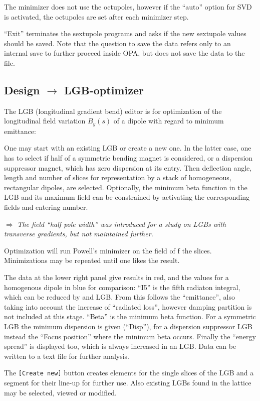 \documentclass[12pt]{article}
\newcommand\todo[1]{$\Longrightarrow$ {\em #1} }
\begin{document}
The minimizer does not use the octupoles, however if the ``auto'' option
for SVD is activated, the octupoles are set after each minimizer step.

``Exit'' terminates the sextupole programs and asks if the new sextupole values
should be saved. Note that the question to save the
data refers only to an internal save to further proceed inside OPA, but does
not save the data to the file.

\subsection{Design $\longrightarrow$ LGB-optimizer}
The LGB (longitudinal gradient bend) editor is for optimization of the longitudinal field variation $B_y(s)$ of a dipole with regard to minimum emittance:

One may start with an existing LGB or create a new one. 
In the latter case, one has to select if half of a symmetric bending magnet is considered, or a dispersion suppressor magnet, which has zero dispersion at its entry. 
Then deflection angle, length and number of slices for representation by a stack of homogeneous, rectangular dipoles, are selected. 
Optionally, the minimum beta function in the LGB and its maximum field can be constrained by activating the corresponding fields and entering number.

\todo{The field ``half pole width'' was introduced for a study on LGBs with transverse gradients, but not maintained further.}

Optimization will run Powell's minimizer on the field of f the slices. 
Minimizations may be repeated until one likes the result.

The data at the lower right panel give results in red, and the values for a homogenous dipole in blue for comparison: ``I5'' is the fifth radiaton integral, which can be reduced by and LGB. From this follows the ``emittance'', also taking into account the increase of ``radiated loss'', however damping partition is not included at this stage. ``Beta'' is the minimum beta function. For a symmetric LGB the minimum dispersion is given (``Disp''), for a dispersion suppressor LGB instead the ``Focus position'' where the minimum beta occurs. Finally the ``energy spread'' is displayed too, which is always increased in an LGB. 
Data can be written to a text file for further analysis. 
 
The {\tt [Create new]} button creates elements for the single slices of the LGB and a segment for their line-up for further use. Also existing LGBs found in the lattice may be selected, viewed or modified.
\end{document}
